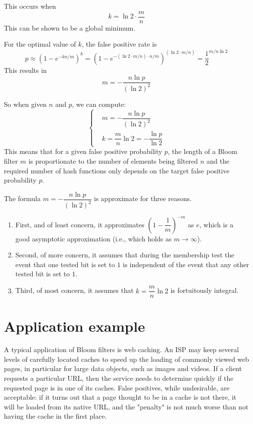 This occurs when $$k = \ln 2 \cdot \dfrac{m}{n}$$
This can be shown to be a global minimum.

For the optimal value of $k$, the false positive rate is
$$
p
\approx (1 - e^{-kn/m})^k
= (1 - e^{- (\ln 2 \cdot m/n) \cdot n/m})^{(\ln 2 \cdot m/n)}
= \dfrac{1}{2}^{m/n \ln 2}
$$
This results in $$m = - \dfrac{n \ln p}{(\ln 2)^2}$$

So when given $n$ and $p$, we can compute:
$$
\left\{
\begin{aligned}
	& m = - \dfrac{n \ln p}{(\ln 2)^2} \\
	& k = \dfrac{m}{n} \ln 2 = - \dfrac{\ln p}{\ln 2}
\end{aligned}
\right.
$$
This means that for a given false positive probability $p$, the length of a Bloom filter $m$ is proportionate to the number of elements being filtered $n$ and
the required number of hash functions only depends on the target false positive probability $p$.

The formula $m = -\dfrac{n \ln p}{(\ln 2)^2}$ is approximate for three reasons.
\begin{enumerate}
\item First, and of least concern, it approximates $(1 - \dfrac{1}{m})^{-m}$ as $e$, which is a good asymptotic approximation (i.e., which holds as $m \to \infty$).
\item Second, of more concern, it assumes that during the membership test the event that one tested bit is set to $1$ is independent of the event that any other tested bit is set to $1$.
\item Third, of most concern, it assumes that $k = \dfrac{m}{n} \ln 2$ is fortuitously integral.
\end{enumerate}

\section{Application example}
A typical application of Bloom filters is web caching.
An ISP may keep several levels of carefully located caches to speed up the loading of commonly viewed web pages, in particular for large data objects, such as images and videos.
If a client requests a particular URL, then the service needs to determine quickly if the requested page is in one of its caches.
False positives, while undesirable, are acceptable: if it turns out that a page thought to be in a cache is not there, it will be loaded from its native URL,
and the "penalty" is not much worse than not having the cache in the first place.

